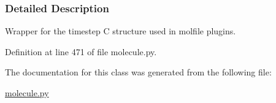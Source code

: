 \subsubsection{Detailed Description}
Wrapper for the timestep C structure used in molfile plugins. 



Definition at line 471 of file molecule.\-py.



The documentation for this class was generated from the following file\-:\begin{DoxyCompactItemize}
\item 
\hyperlink{molecule_8py}{molecule.\-py}\end{DoxyCompactItemize}
